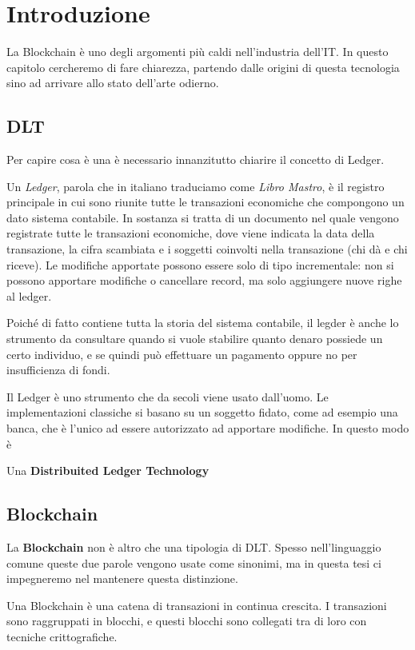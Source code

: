 \chapter{Introduzione}

La Blockchain è uno degli argomenti più caldi nell'industria dell'IT. In questo
capitolo cercheremo di fare chiarezza, partendo dalle origini di questa tecnologia
sino ad arrivare allo stato dell'arte odierno.

\section{DLT}
Per capire cosa è una  è necessario
innanzitutto chiarire il concetto di Ledger.

Un \textit{Ledger}, parola che in italiano traduciamo come \textit{Libro Mastro},
è il registro principale in cui sono riunite tutte le transazioni economiche
che compongono un dato sistema contabile. In sostanza si tratta di un documento
nel quale vengono registrate tutte le transazioni economiche, dove viene
indicata la data della transazione, la cifra scambiata e i soggetti coinvolti
nella transazione (chi dà e chi riceve). Le modifiche apportate possono essere solo
di tipo incrementale: non si possono apportare modifiche o cancellare record,
ma solo aggiungere nuove righe al ledger.

Poiché di fatto contiene tutta la storia del sistema contabile, il legder è anche
lo strumento da consultare quando si vuole stabilire quanto denaro possiede un certo
individuo, e se quindi può effettuare un pagamento oppure no per insufficienza
di fondi.

Il Ledger è uno strumento che da secoli viene usato dall'uomo. Le implementazioni 
classiche si basano su un soggetto fidato, come ad esempio una banca, che è 
l'unico ad essere autorizzato ad apportare modifiche. In questo modo è 

Una \textbf{Distribuited Ledger Technology}

\section{Blockchain}
La \textbf{Blockchain} non è altro che una tipologia di DLT. Spesso nell'linguaggio
comune queste due parole vengono usate come sinonimi, ma in questa tesi ci impegneremo
nel mantenere questa distinzione.

Una Blockchain è una catena di transazioni in continua crescita. I transazioni sono
raggruppati in blocchi, e questi blocchi sono collegati tra di loro con tecniche
crittografiche.

